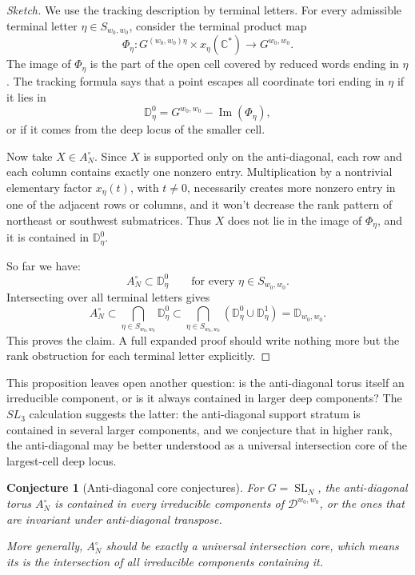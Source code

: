 \documentclass[12pt]{amsart}
\newcommand{\D}{\mathbb D}
\newcommand{\SL}{\operatorname{SL}}
\theoremstyle{plain}
\newtheorem{conjecture}[theorem]{Conjecture}
\theoremstyle{definition}
\theoremstyle{remark}
\begin{document}
\begin{proof}[Sketch]
We use the tracking description by terminal letters.  For every admissible terminal letter \(\eta\in S_{w_0,w_0}\), consider the terminal product map
\[
   \Phi_\eta:
   G^{(w_0,w_0)\eta}\times x_\eta(\mathbb C^*)
   \longrightarrow
   G^{w_0,w_0}.
\]
The image of \(\Phi_\eta\) is the part of the open cell covered by reduced words ending in \(\eta\).  The tracking formula says that a point escapes all coordinate tori ending in \(\eta\) if it lies in
\[
   \D^0_\eta
   =
   G^{w_0,w_0}- \operatorname{Im}(\Phi_\eta),
\]
or if it comes from the deep locus of the smaller cell.

Now take \(X\in A_N^\circ\).  Since \(X\) is supported only on the anti-diagonal, each row and each column contains exactly one nonzero entry.  Multiplication by a nontrivial elementary factor \(x_\eta(t)\), with \(t\neq0\), necessarily creates more nonzero entry in one of the adjacent rows or columns, and it won't decrease the rank pattern of northeast or southwest submatrices. Thus \(X\) does not lie in the image of \(\Phi_\eta\), and it is contained in \(\D^0_\eta\).

So far we have:
\[
   A_N^\circ\subset \D^0_\eta
   \qquad
   \text{for every }\eta\in S_{w_0,w_0}.
\]
Intersecting over all terminal letters gives
\[
   A_N^\circ
   \subset
   \bigcap_{\eta\in S_{w_0,w_0}}\D^0_\eta
   \subset
   \bigcap_{\eta\in S_{w_0,w_0}}
   \left(\D^0_\eta\cup \D^1_\eta\right)
   =
   \D_{w_0,w_0}.
\]
This proves the claim.  A full expanded proof should write nothing more but the rank obstruction for each terminal letter explicitly.
\end{proof}

This proposition leaves open another question: is the anti-diagonal torus itself an irreducible component, or is it always contained in larger deep components?  The \(SL_3\) calculation suggests the latter: the anti-diagonal support stratum is contained in several larger components, and we conjecture that in higher rank, the anti-diagonal may be better understood as a universal intersection core of the largest-cell deep locus.

\begin{conjecture}[Anti-diagonal core conjectures]
\label{conj:anti-diagonal-core}
For \(G=\SL_N\), the anti-diagonal torus \(A_N^\circ\) is contained in every irreducible components of \(\mathcal D^{w_0,w_0}\), or the ones that are invariant under anti-diagonal transpose. 

More generally, \(A_N^\circ\) should be exactly a universal intersection core, which means its is the intersection of all irreducible components containing it.
\end{conjecture}
\end{document}
